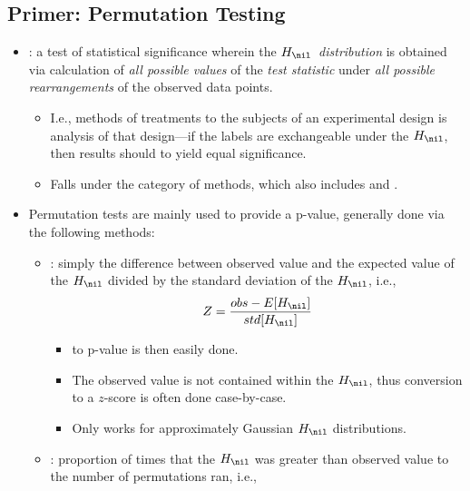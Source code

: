 \begin{itemize}
  \subsection{Primer: Permutation Testing}
  \begin{itemize}
    \item {}: a test of statistical significance wherein the \emph{\(H_\nil\)~distribution} is obtained via calculation of \emph{all possible values} of the \emph{test statistic} under \emph{all possible rearrangements} of the observed data points.
      \begin{itemize}
        \item I.e., methods of treatments to the subjects of an experimental design is analysis of that design---if the labels are exchangeable under the \(H_\nil\), then results should to yield equal significance.
        \item Falls under the category of  methods, which also includes \hyperref[Subsection: Primer: Cross-Validation]{} and \hyperref[Subsection: Primer: Bootstrapping]{}.
      \end{itemize}
    \item Permutation tests are mainly used to provide a p-value, generally done via the following methods:
      \begin{itemize}
        \item {}: simply the difference between observed value and the expected value of the \(H_\nil\) divided by the standard deviation of the \(H_\nil\), i.e.,
        \[%
        Z = \frac{obs - E[H_\nil]}{std[H_\nil]}
        \]%
        \begin{itemize}
          \item \hyperref[Subsection: Degrees of Freedom]{} to p-value is then easily done. 
          \item The observed value is not contained within the \(H_\nil\), thus conversion to a \(z\)-score is often done case-by-case.
          \item Only works for approximately Gaussian \(H_\nil\) distributions.
        \end{itemize}
        \item {}: proportion of times that the \(H_\nil\) was greater than observed value to the number of permutations ran, i.e.,

\end{itemize}
\end{itemize}
\end{itemize}
